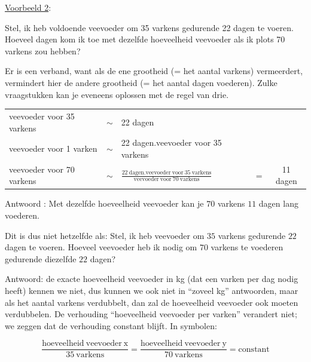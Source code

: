 \medskip{}


\uline{Voorbeeld 2}: 

Stel, ik heb voldoende veevoeder om 35 varkens gedurende 22 dagen
te voeren. Hoeveel dagen kom ik toe met dezelfde hoeveelheid veevoeder
als ik plots 70 varkens zou hebben?

Er is een verband, want als de ene grootheid (= het aantal varkens)
vermeerdert, vermindert hier de andere grootheid (= het aantal dagen
voederen). Zulke vraagstukken kan je eveneens oplossen met de regel
van drie. \medskip{}



\begin{tabular}{lclcc}
veevoeder voor 35 varkens & $\sim$ & 22 dagen &  & \\
veevoeder voor 1 varken & $\sim$ & 22 dagen.veevoeder voor 35 varkens &  & \\
veevoeder voor 70 varkens & $\sim$ & $\frac{22\:\mathrm{dagen}.\mathrm{veevoeder\:voor}\:35\:\mathrm{varkens}}{\mathrm{veevoeder\:voor}\:70\:\mathrm{varkens}}$ & = & 11 dagen\\
\end{tabular}

Antwoord : Met dezelfde hoeveelheid veevoeder kan je $70$ varkens $11$
dagen lang voederen. \bigskip{}


Dit is dus niet hetzelfde als: Stel, ik heb veevoeder om $35$ varkens
gedurende $22$ dagen te voeren. Hoeveel veevoeder heb ik nodig om $70$
varkens te voederen gedurende diezelfde $22$ dagen?

Antwoord: de exacte hoeveelheid veevoeder in kg (dat een varken per
dag nodig heeft) kennen we niet, dus kunnen we ook niet in ``zoveel
kg'' antwoorden, maar als het aantal varkens verdubbelt, dan zal
de hoeveelheid veevoeder ook moeten verdubbelen. De verhouding ``hoeveelheid
veevoeder per varken'' verandert niet; we zeggen dat de verhouding
constant blijft. In symbolen:

\begin{equation*}
\frac{\mathrm{hoeveelheid\:veevoeder\:x}}{35\:\mathrm{varkens}}=\frac{\mathrm{hoeveelheid\:veevoeder\:y}}{70\:\mathrm{varkens}}=\text{constant}
\end{equation*}

